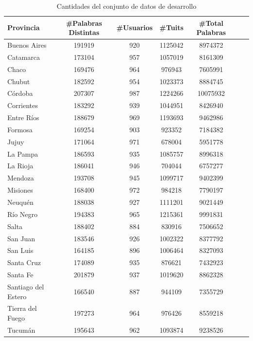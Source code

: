 \begin{table}[ht]
\centering

\label{tab:cantidades}
\begin{tabular}[width=0.7\textwidth]{|l|c|c|c|c|c|c|}
\hline
Provincia      & \#Palabras Distintas & \#Usuarios & \#Tuits & \#Total Palabras \\ \hline
Buenos Aires   & 191919       & 920          & 1125042    & 8974372  \\
Catamarca      & 173104       & 957          & 1057019    & 8161309   \\
Chaco          & 169476       & 964          & 976943     & 7605991   \\
Chubut         & 182592       & 954          & 1023373    & 8884745   \\
Córdoba        & 207307       & 987          & 1224266    & 10075932  \\
Corrientes     & 183292       & 939          & 1044951    & 8426940   \\
Entre Ríos     & 188679       & 969          & 1193693    & 9462986  \\
Formosa        & 169254       & 903          & 923352     & 7184382   \\
Jujuy          & 171064       & 971          & 678004     & 5951778   \\
La Pampa       & 186593       & 935          & 1085757    & 8996318  \\
La Rioja       & 186041       & 946          & 704044     & 6757277  \\
Mendoza        & 193708       & 945          & 1099717    & 9402399   \\
Misiones       & 168400       & 972          & 984218     & 7790197   \\
Neuquén        & 188038       & 927          & 1111201    & 9021449   \\
Río Negro      & 194383       & 965          & 1215361    & 9991831  \\
Salta          & 188402       & 884          & 830916     & 7506652   \\
San Juan       & 183546       & 926          & 1002322    & 8377792  \\
San Luis       & 164185       & 896          & 1006464    & 8327093  \\
Santa Cruz     & 174089       & 935          & 876621     & 7432923  \\
Santa Fe       & 201879       & 937          & 1019620    & 8862328  \\
Santiago del Estero       & 166540       & 887          & 944109     & 7355729  \\
Tierra del Fuego & 197273       & 964          & 976426     & 8559218   \\
Tucumán        & 195643       & 962          & 1093874    & 9238526 \\
  \hline
\end{tabular}
\caption{Cantidades del conjunto de datos de desarrollo}
\end{table}



